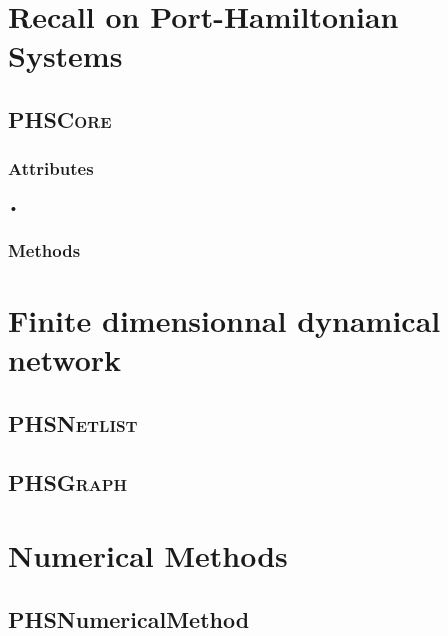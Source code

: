 \documentclass[10pt,a4paper]{article}
\begin{document}
\section{Recall on Port-Hamiltonian Systems}
\subsection{\textsc{PHSCore}}
\subsubsection{Attributes}
\begin{description}
\item[•]
\end{description}
\subsubsection{Methods}


\section{Finite dimensionnal dynamical network}
\subsection{\textsc{PHSNetlist}}
\subsection{\textsc{PHSGraph}}

\section{Numerical Methods}
\subsection{PHSNumericalMethod}
\end{document}
